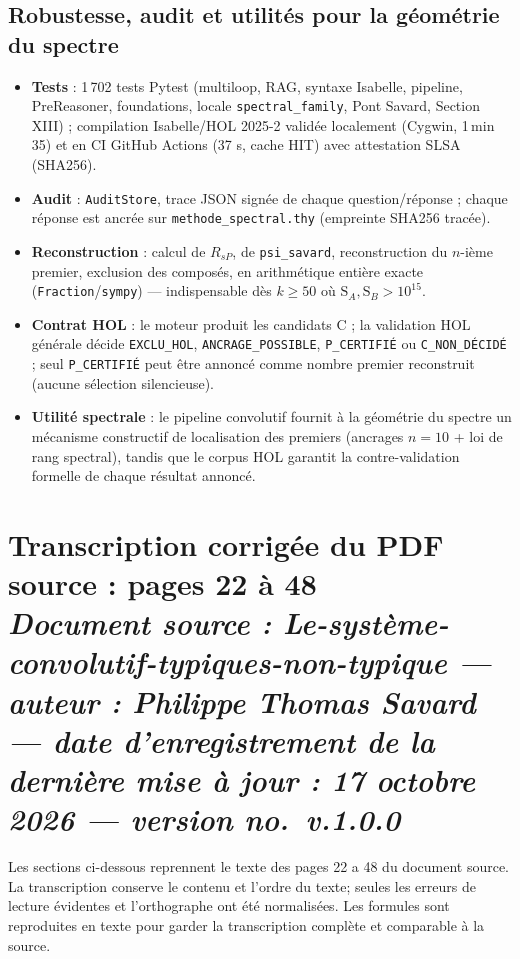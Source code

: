 \documentclass[11pt,a4paper]{article}
\newcommand{\SA}{\mathrm{S}_A}
\newcommand{\SB}{\mathrm{S}_B}
\begin{document}
\begin{samepage}
\subsection{Robustesse, audit et utilités pour la géométrie du spectre}

\begin{itemize}[nosep]
  \item \textbf{Tests} : 1\,702 tests Pytest (multiloop, RAG, syntaxe Isabelle, pipeline, PreReasoner, foundations, locale \texttt{spectral\_family}, Pont Savard, Section XIII) ; compilation Isabelle/HOL 2025-2 validée localement (Cygwin, 1\,min\,35) et en CI GitHub Actions (37 s, cache HIT) avec attestation SLSA (SHA256).
  \item \textbf{Audit} : \texttt{AuditStore}, trace JSON signée de chaque question/réponse ; chaque réponse est ancrée sur \texttt{methode\_spectral.thy} (empreinte SHA256 tracée).
  \item \textbf{Reconstruction} : calcul de $R_{sP}$, de \texttt{psi\_savard}, reconstruction du $n$-ième premier, exclusion des composés, en arithmétique entière exacte (\texttt{Fraction}/\texttt{sympy}) --- indispensable dès $k \ge 50$ où $\SA, \SB > 10^{15}$.
  \item \textbf{Contrat HOL} : le moteur produit les candidats C ; la validation HOL générale décide \texttt{EXCLU\_HOL}, \texttt{ANCRAGE\_POSSIBLE}, \texttt{P\_CERTIFIÉ} ou \texttt{C\_NON\_DÉCIDÉ} ; seul \texttt{P\_CERTIFIÉ} peut être annoncé comme nombre premier reconstruit (aucune sélection silencieuse).
  \item \textbf{Utilité spectrale} : le pipeline convolutif fournit à la géométrie du spectre un mécanisme constructif de localisation des premiers (ancrages $n=10$ + loi de rang spectral), tandis que le corpus HOL garantit la contre-validation formelle de chaque résultat annoncé.
\end{itemize}
\end{samepage}

\section*{Transcription corrig\'ee du PDF source : pages 22 \`a 48\\[3pt]
{\normalsize\itshape Document source : \og Le-syst\`eme-convolutif-typiques-non-typique \fg{} ---
auteur : Philippe Thomas Savard --- date d'enregistrement de la derni\`ere mise \`a jour :
17 octobre 2026 --- version no.~v.1.0.0}}
Les sections ci-dessous reprennent le texte des pages 22 a 48 du document source. La
transcription conserve le contenu et l'ordre du texte; seules les erreurs de lecture
\'evidentes et l'orthographe ont \'et\'e normalis\'ees. Les formules sont reproduites en
texte pour garder la transcription compl\`ete et comparable \`a la source.
\smallskip
\end{document}
